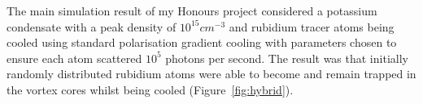 The main simulation result of my Honours project considered a potassium condensate with a peak density of $10^{15}\unit{cm}^{-3}$ and rubidium tracer atoms being cooled using standard polarisation gradient cooling with parameters chosen to ensure each atom scattered $10^5$ photons per second. The result was that initially randomly distributed rubidium atoms were able to become and remain trapped in the vortex cores whilst being cooled (Figure~\ref{fig:hybrid}).

\begin{figure}
\centering
\noindent{}
\noindent{}
\noindent{}

\end{figure}
